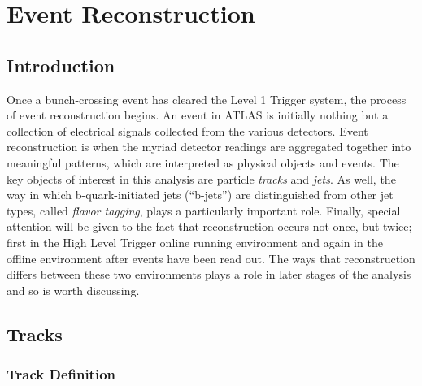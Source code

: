\chapter{Event Reconstruction} \label{chapter:reconstruction}

    \section{Introduction}

        Once a bunch-crossing event has cleared the Level 1 Trigger system, the process of event reconstruction begins.
        An event in ATLAS is initially nothing but a collection of electrical signals collected from the various detectors.
        Event reconstruction is when the myriad detector readings are aggregated together into meaningful patterns,
            which are interpreted as physical objects and events.
        The key objects of interest in this analysis are particle \textit{tracks} and \textit{jets}.
        As well, the way in which b-quark-initiated jets (``b-jets'') are distinguished from other jet types,
            called \textit{flavor tagging}, plays a particularly important role.
        Finally, special attention will be given to the fact that reconstruction occurs not once, but twice;
            first in the High Level Trigger online running environment
            and again in the offline environment after events have been read out.
        The ways that reconstruction differs between these two environments plays a role
            in later stages of the analysis and so is worth discussing.

    \FloatBarrier
    \section{Tracks} \label{sec:reco_tracks}
            
        \subsection{Track Definition}
            
